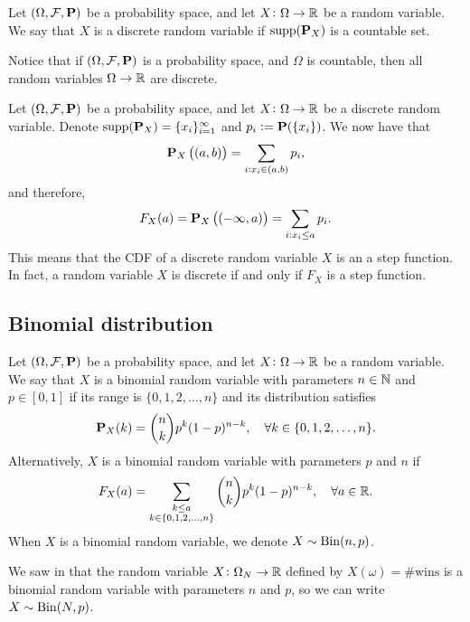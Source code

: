 \documentclass[11pt,a4paper]{article}
\begin{document}
\begin{definition}
  Let $(\Omega ,\mathcal F, \mathbf{P})$ be a probability space,
  and let $X \colon \Omega \to \mathbb{R}$ be a random variable.
  We say that $X$ is a discrete random variable if $\operatorname{supp}(\mathbf{P}_X)$ is a 
  countable set.
\end{definition}
\begin{remark}
  Notice that if $(\Omega ,\mathcal F, \mathbf{P})$ is a probability space,
  and $\Omega$ is countable, then all random variables $\Omega \to \mathbb{R}$
  are discrete.
\end{remark}
\begin{remark}
  Let $(\Omega ,\mathcal F, \mathbf{P})$ be a probability space,
  and let $X \colon \Omega \to \mathbb{R}$ be a discrete random variable.
  Denote $\operatorname{supp}(\mathbf{P}_X) = \{x_i\}_{i=1}^{\infty}$ and $p_i := \mathbf{P}(\{x_i\})$.
  We now have that
  \[
    \mathbf{P}_X \left((a,b)\right) = \sum_{i : x_i \in (a,b)} p_i,
  \]
  and therefore,
  \[
    F_X(a) =
    \mathbf{P}_X \left((-\infty,a)\right) = \sum_{i:x_i \le a} p_i.
  \]
  This means that the CDF of a discrete random variable $X$ is an a step
  function.
  In fact, a random variable $X$ is discrete if and only if
  $F_X$ is a step function.
\end{remark}

\subsection{Binomial distribution}
\begin{definition}
  Let $(\Omega ,\mathcal F, \mathbf{P})$ be a probability space,
  and let $X \colon \Omega \to \mathbb{R}$ be a random variable.
  We say that $X$ is a binomial random variable with parameters
  $n \in \mathbb{N}$ and $p \in [0,1]$ if its range is $\{0,1,2,\dots,n\}$ and
  its distribution satisfies
  \[
    \mathbf{P}_X(k) = \binom{n}{k} p^k (1-p)^{n-k}, \quad 
    \forall k \in \{0,1,2,\dots,n\}.
  \]
  Alternatively, $X$ is a binomial random variable with parameters
  $p$ and $n$ if
  \[
    F_X(a) = \sum_{\substack{k \le a \\ k \in \{0,1,2,\dots,n\}}}
    \binom{n}{k} p^k (1-p)^{n-k}, \quad \forall a \in \mathbb{R}.
  \]
  When $X$ is a binomial random variable, we denote $X \sim \operatorname{Bin}(n,p)$.
\end{definition}

\begin{remark}
  We saw in 
  that the random variable $X \colon \Omega_{N} \to \mathbb{R}$ defined
  by $X(\omega) = \#\text{wins}$ is a binomial random variable
  with parameters $n$ and $p$,
  so we can write $X \sim \operatorname{Bin}(N,p)$.
\end{remark}
\end{document}
